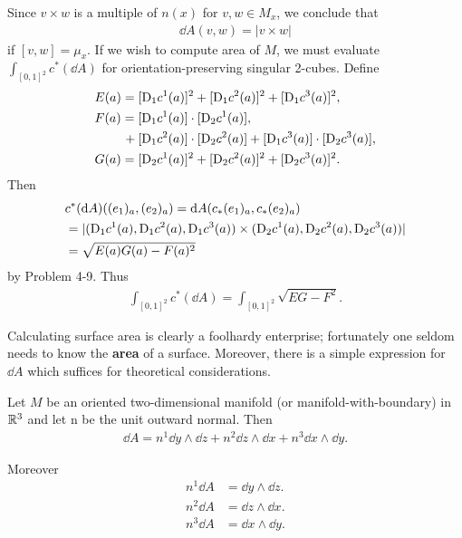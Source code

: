 Since $v\times w$ is a multiple of $n(x)$ for $v,w\in M_x$, we conclude that 
\begin{align*}
  \dd A(v, w) = |v\times w|
\end{align*} 
if $[v, w]=\mu_x$. If we wish to compute area of $M$, we must evaluate $\int_{[0,1]^2} c^*(\dd A)$ for 
orientation-preserving singular 2-cubes. Define 
\begin{align*}
  & E(a) = [\mathrm{D}_1c^1(a)]^2 + [\mathrm{D}_1c^2(a)]^2 + [\mathrm{D}_1c^3(a)]^2,\\
  & F(a) = [\mathrm{D}_1c^1(a)]\cdot[\mathrm{D}_2c^1(a)], \\
  & \hspace*{2.2em} + [\mathrm{D}_1c^2(a)]\cdot[\mathrm{D}_2c^2(a)] + [\mathrm{D}_1c^3(a)]\cdot[\mathrm{D}_2c^3(a)],\\
  & G(a) = [\mathrm{D}_2c^1(a)]^2 + [\mathrm{D}_2c^2(a)]^2 + [\mathrm{D}_2c^3(a)]^2.
\end{align*}
Then 
\begin{align*}
  & c^*(\mathrm{d} A)((e_1)_a, (e_2)_a) = \mathrm{d} A(c_*(e_1)_a, c_*(e_2)_a) \\
  & = |(\mathrm{D}_1c^1(a), \mathrm{D}_1c^2(a), \mathrm{D}_1c^3(a)) \times (\mathrm{D}_2c^1(a), \mathrm{D}_2c^2(a), \mathrm{D}_2c^3(a))| \\
  & = \sqrt{E(a)G(a) - F(a)^2}
\end{align*}
by Problem 4-9. Thus 
\begin{align*}
  \int_{[0,1]^2} c^*(\dd A) = \int_{[0,1]^2} \sqrt{EG-F^2}.
\end{align*}

Calculating surface area is clearly a foolhardy enterprise;
fortunately one seldom needs to know the \textbf{area} of a surface.
Moreover, there is a simple expression for $\dd A$ which suffices for
theoretical considerations.

\begin{theorem}
  Let $M$ be an oriented two-dimensional manifold (or manifold-with-boundary) in $\mathbb{R}^3$ 
  and let n be the unit outward normal. Then
  \begin{align}
    \dd A=n^1\dd y\wedge\dd z+n^2\dd z\wedge\dd x+n^3\dd x\wedge\dd y.
  \end{align}

  Moreover 
  \begin{align}
    n^1\dd A & = \dd y\wedge \dd z.\\
    n^2\dd A & = \dd z\wedge \dd x.\\
    n^3\dd A & = \dd x\wedge \dd y.
  \end{align}
\end{theorem}


